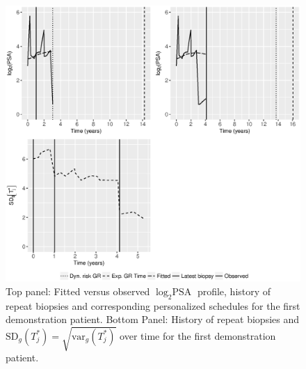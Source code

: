 \begin{figure}
\centerline{
\includegraphics[width=\columnwidth]{images/prias_demo/case_911_t3.eps}
}
\caption{Top panel: Fitted versus observed $\log_2 \mbox{PSA}$ profile, history of repeat biopsies and corresponding personalized schedules for the first demonstration patient. Bottom Panel: History of repeat biopsies and $\mbox{SD}_g(T^*_j) = \sqrt{\mbox{var}_g(T^*_j)}$ over time for the first demonstration patient.}
\label{fig : prias_demo_pid_911}
\end{figure}